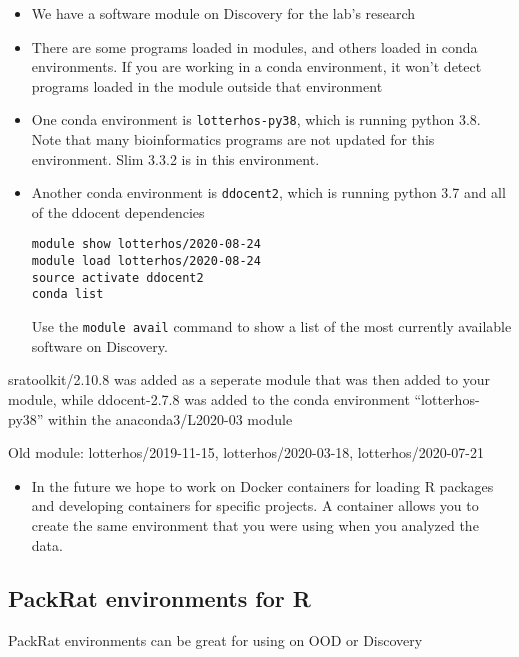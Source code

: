 \documentclass[
  letterpaper,
  DIV=11,
  numbers=noendperiod]{scrreprt}
\providecommand{\tightlist}{%
  \setlength{\itemsep}{0pt}\setlength{\parskip}{0pt}}\usepackage{longtable,booktabs,array}
\begin{document}
\begin{itemize}
\item
  We have a software module on Discovery for the lab's research
\item
  There are some programs loaded in modules, and others loaded in conda
  environments. If you are working in a conda environment, it won't
  detect programs loaded in the module outside that environment
\item
  One conda environment is \texttt{lotterhos-py38}, which is running
  python 3.8. Note that many bioinformatics programs are not updated for
  this environment. Slim 3.3.2 is in this environment.
\item
  Another conda environment is \texttt{ddocent2}, which is running
  python 3.7 and all of the ddocent dependencies

\begin{verbatim}
module show lotterhos/2020-08-24
module load lotterhos/2020-08-24
source activate ddocent2
conda list
\end{verbatim}

  Use the \texttt{module\ avail} command to show a list of the most
  currently available software on Discovery.
\end{itemize}

sratoolkit/2.10.8 was added as a seperate module that was then added to
your module, while ddocent-2.7.8 was added to the conda environment
``lotterhos-py38'' within the anaconda3/L2020-03 module

Old module: lotterhos/2019-11-15, lotterhos/2020-03-18,
lotterhos/2020-07-21

\begin{itemize}
\tightlist
\item
  In the future we hope to work on Docker containers for loading R
  packages and developing containers for specific projects. A container
  allows you to create the same environment that you were using when you
  analyzed the data.
\end{itemize}

\hypertarget{packrat-environments-for-r}{%
\subsection*{\texorpdfstring{\textbf{PackRat environments for
R}}{PackRat environments for R}}\label{packrat-environments-for-r}}

PackRat environments can be great for using on OOD or Discovery
\end{document}
